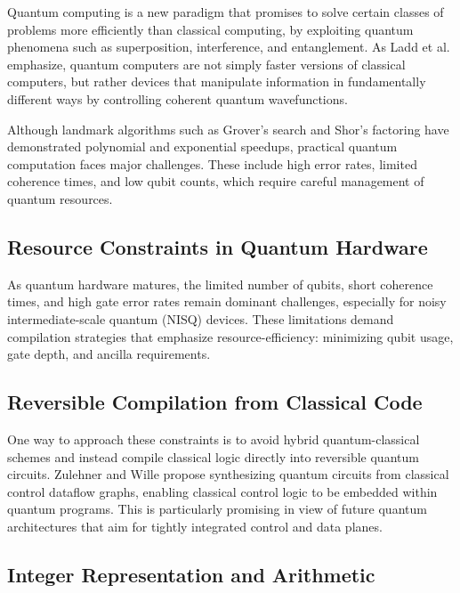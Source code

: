 \documentclass[conference]{IEEEtran}
\begin{document}
Quantum computing is a new paradigm that promises to solve certain classes of problems more efficiently than classical computing, by exploiting quantum phenomena such as superposition, interference, and entanglement. %
As Ladd et al. emphasize, quantum computers are not simply faster versions of classical computers, but rather devices that manipulate information in fundamentally different ways by controlling coherent quantum wavefunctions. %

Although landmark algorithms such as Grover’s search and Shor’s factoring have demonstrated polynomial and exponential speedups, practical quantum computation faces major challenges. These include high error rates, limited coherence times, and low qubit counts, which require careful management of quantum resources. %

\subsection{Resource Constraints in Quantum Hardware}

As quantum hardware matures, the limited number of qubits, short coherence times, and high gate error rates remain dominant challenges, especially for noisy intermediate-scale quantum (NISQ) devices. These limitations demand compilation strategies that emphasize resource-efficiency: minimizing qubit usage, gate depth, and ancilla requirements. %

\subsection{Reversible Compilation from Classical Code}

One way to approach these constraints is to avoid hybrid quantum-classical schemes and instead compile classical logic directly into reversible quantum circuits. Zulehner and Wille propose synthesizing quantum circuits from classical control dataflow graphs, enabling classical control logic to be embedded within quantum programs. %
This is particularly promising in view of future quantum architectures that aim for tightly integrated control and data planes.

\subsection{Integer Representation and Arithmetic}
\end{document}
